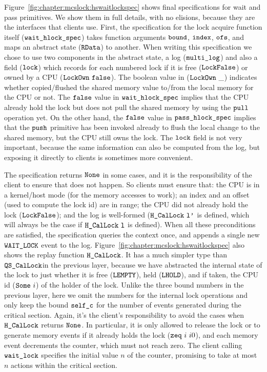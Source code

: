 Figure~\ref{fig:chapter:mcslock:hswaitlockspec} shows  final specifications for 
wait and pass primitives. We show them in full details, with no elisions,
because they are the interfaces that clients use. First, the
specification for the lock acquire function itself
(${\mathrm{\texttt{wait\_hlock\_spec}}}$) takes  function arguments
${\mathrm{\texttt{bound}}}$, ${\mathrm{\texttt{index}}}$, ${\mathrm{\texttt{ofs}}}$, and maps an
abstract state (${\mathrm{\texttt{RData}}}$) to another. When writing this
specification we chose to use two components in the abstract state, a
log (${\mathrm{\texttt{multi\_log}}}$) and also a field (${\mathrm{\texttt{lock}}}$) which
records for each numbered lock if it is free (${\mathrm{\texttt{LockFalse}}}$)
or owned by a CPU (${\mathrm{\texttt{LockOwn}}} \ {{\mathrm{\texttt{false}}}}$). 
The boolean value in (${\mathrm{\texttt{LockOwn}}}\ \_$) indicates whether copied/flushed the shared memory value to/from the local memory for the CPU or not.
The ${{\mathrm{\texttt{false}}}}$ value in ${\mathrm{\texttt{wait\_hlock\_spec}}}$ implies that the CPU already hold the lock but does not pull the shared memory by using the ${\mathrm{\texttt{pull}}}$ operation yet. 
On the other hand, the  ${{\mathrm{\texttt{false}}}}$ value   in ${\mathrm{\texttt{pass\_hlock\_spec}}}$ implies that the ${\mathrm{\texttt{push}}}$ primitive has been invoked already 
to flush the local change to the shared memory, but the CPU still owns the lock.
The ${\mathrm{\texttt{lock}}}$ field is
not very important, because the same information can also be computed
from the log, but exposing it directly to clients is sometimes more
convenient.

The specification returns ${\mathrm{\texttt{None}}}$ in some
cases, and it is the
responsibility of the client to ensure  that does not
happen. So clients must ensure that: the CPU is in a kernel/host
mode (for the memory accesses to work); an index and an offset (used to
compute the lock id) are in range; the CPU did not already hold the
lock (${\mathrm{\texttt{LockFalse}}}$); and the log is well-formed
($\HCalLock\ \codeinmath{l'}$ is defined, which will always be the case if
${\mathrm{\texttt{H\_CalLock}}}\ {\mathrm{\texttt{l}}}$ is defined).  When all these preconditions are
satisfied, the specification queries the context once, and appends a
single new ${\mathrm{\texttt{WAIT\_LOCK}}}$ event to the log.
Figure~\ref{fig:chapter:mcslock:hswaitlockspec} also shows the replay function
${\mathrm{\texttt{H\_CalLock}}}$.
It has a much simpler type than ${\mathrm{\texttt{QS\_CalLock}}}$in the
previous layer, because we have abstracted the internal state of the lock
to just whether it is free (${\mathrm{\texttt{LEMPTY}}}$),
held (${\mathrm{\texttt{LHOLD}}}$), and if taken, the CPU id (${\mathrm{\texttt{Some}}}\ i$)
of the holder of the lock. Unlike the three bound numbers in the
previous layer, here we omit the numbers for the internal lock
operations and only keep the bound ${\mathrm{\texttt{self\_c}}}$ for the number
of events generated during the critical section. Again, it's the
client's responsibility to avoid the cases when ${\mathrm{\texttt{H\_CalLock}}}$
returns ${\mathrm{\texttt{None}}}$. In particular, it is only allowed to release
the lock or to generate memory events if it already holds the lock
(${\mathrm{\texttt{zeq}}} \ {i} \ {i0}$), and each memory event decrements the counter,
which must not reach zero. The client calling ${\mathrm{\texttt{wait\_lock}}}$
specifies the initial value $n$ of the counter, promising to take at
most $n$ actions within the critical section.



